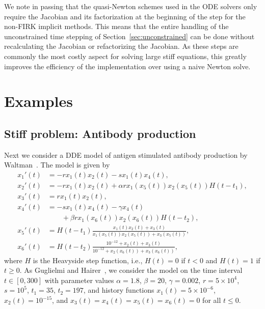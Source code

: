 \documentclass{juliacon}
\begin{document}
We note in passing that the quasi-Newton schemes used in the ODE solvers only require the
Jacobian and its factorization at the beginning of the step for the non-FIRK implicit methods.
This means that the entire handling of the unconstrained time stepping of 
Section~\ref{sec:unconstrained} can be done without recalculating the Jacobian or refactorizing
the Jacobian. As these steps are commonly the most costly aspect for solving large stiff equations,
this greatly improves the efficiency of the implementation over using a naive Newton solve.

\section{Examples}

\subsection{Stiff problem: Antibody production}

Next we consider a DDE model of antigen stimulated antibody production by Waltman~\cite{waltman78_threshold_model_antigen}.
The model is given by
\begin{equation}\label{eq:waltman}
    \begin{aligned}
        x_1'(t) &= - r x_1(t) x_2(t) - s x_1(t) x_4(t), \\
        x_2'(t) &= - r x_1(t) x_2(t) + \alpha r x_1(x_5(t)) x_2(x_5(t)) H(t - t_1), \\
        x_3'(t) &= r x_1(t) x_2(t), \\
        x_4'(t) &= - s x_1(t) x_4(t) - \gamma x_4(t) \\
                &\qquad +\beta r x_1(x_6(t)) x_2(x_6(t)) H(t - t_2), \\
        x_5'(t) &= H(t - t_1) \frac{x_1(t) x_2(t) + x_3(t)}{x_1(x_5(t)) x_2(x_5(t)) + x_3(x_5(t))}, \\
        x_6'(t) &= H(t - t_2) \frac{10^{-12} + x_2(t) + x_3(t)}{10^{-12} + x_2(x_6(t)) + x_3(x_6(t))},
    \end{aligned}
\end{equation}
where $H$ is the Heavyside step function, i.e., $H(t) = 0$ if $t < 0$ and
$H(t) = 1$ if $t \geq 0$. As Guglielmi and Hairer~\cite{guglielmi01_implementing_radau},
we consider the model on the time interval $t \in [0, 300]$ with parameter values
$\alpha = 1.8$, $\beta = 20$, $\gamma = 0.002$, $r = 5 \times 10^4$, $s = 10^5$,
$t_1 = 35$, $t_2 = 197$, and history functions $x_1(t) = 5 \times 10^{-6}$,
$x_2(t) = 10^{-15}$, and $x_3(t) = x_4(t) = x_5(t) = x_6(t) = 0$ for all $t \leq 0$.
\end{document}
